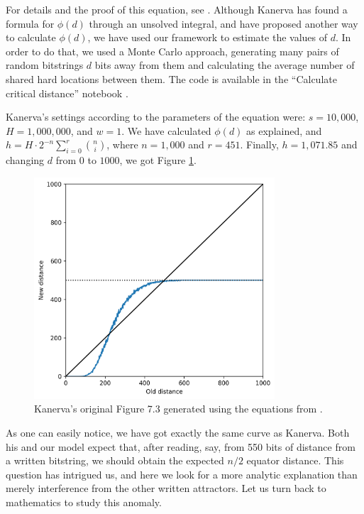 For details and the proof of this equation, see \citet{brogliato2014sparse}. Although Kanerva has found a formula for $\phi(d)$ through an unsolved integral, and \citet{de1995geometrical} have proposed another way to calculate $\phi(d)$, we have used our framework to estimate the values of $d$. In order to do that, we used a Monte Carlo approach, generating many pairs of random bitstrings $d$ bits away from them and calculating the average number of shared hard locations between them. The code is available in the ``Calculate critical distance'' notebook \citep{sdmframework}.

Kanerva's settings according to the parameters of the equation were: $s=10,000$, $H=1,000,000$, and $w=1$. We have calculated $\phi(d)$ as explained, and $h = H \cdot 2^{-n} \sum_{i=0}^{r} \binom{n}{i}$, where $n=1,000$ and $r=451$. Finally, $h=1,071.85$ and changing $d$ from $0$ to $1000$, we got Figure \ref{fig:kanerva-figure-73-calculated}.

\begin{figure}[!htb]
\centering\includegraphics[width=0.8\textwidth]{./images02/calculated-table-72.png}
\caption{Kanerva's original Figure 7.3 generated using the equations from \citet{brogliato2014sparse}.
\label{fig:kanerva-figure-73-calculated}
}
\end{figure}

As one can easily notice, we have got exactly the same curve as Kanerva. Both his and our model expect that, after reading, say, from 550 bits of distance from a written bitstring, we should obtain the expected $n/2$ equator distance. This question has intrigued us, and here we look for a more analytic explanation than merely interference from the other written attractors. Let us turn back to mathematics to study this anomaly.






